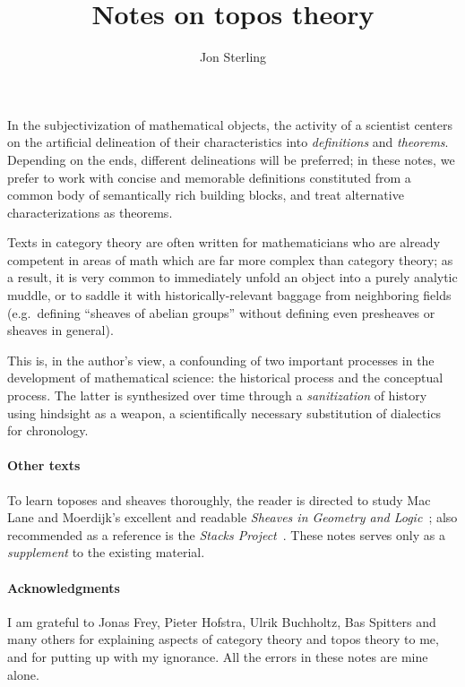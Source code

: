\documentclass{article}
\title{Notes on topos theory}
\author{Jon Sterling}
\affil{Carnegie Mellon University}
\date{}
\begin{document}
\maketitle

In the subjectivization of mathematical objects, the activity of a
scientist centers on the artificial delineation of their
characteristics into \emph{definitions} and \emph{theorems}. Depending
on the ends, different delineations will be preferred; in these notes,
we prefer to work with concise and memorable definitions constituted
from a common body of semantically rich building blocks, and treat
alternative characterizations as theorems.

Texts in category theory are often written for mathematicians who
are already competent in areas of math which are far more complex than
category theory; as a result, it is very common to immediately unfold
an object into a purely analytic muddle, or to saddle it with
historically-relevant baggage from neighboring fields (e.g.\ defining
``sheaves of abelian groups'' without defining even presheaves or
sheaves in general).

This is, in the author's view, a confounding of two important
processes in the development of mathematical science: the historical
process and the conceptual process. The latter is synthesized over
time through a \emph{sanitization} of history using hindsight as a
weapon, a scientifically necessary substitution of dialectics for
chronology.

\paragraph{Other texts}
To learn toposes and sheaves thoroughly, the reader is directed to
study Mac Lane and Moerdijk's excellent and readable \emph{Sheaves in
  Geometry and Logic}~\cite{maclane-moerdijk:1992}; also recommended
as a reference is the \emph{Stacks
  Project}~\cite{stacks-project}. These notes serves only as a
\emph{supplement} to the existing material.

\paragraph{Acknowledgments}

I am grateful to Jonas Frey, Pieter Hofstra, Ulrik Buchholtz, Bas
Spitters and many others for explaining aspects of category theory and
topos theory to me, and for putting up with my ignorance. All the
errors in these notes are mine alone.
\end{document}
